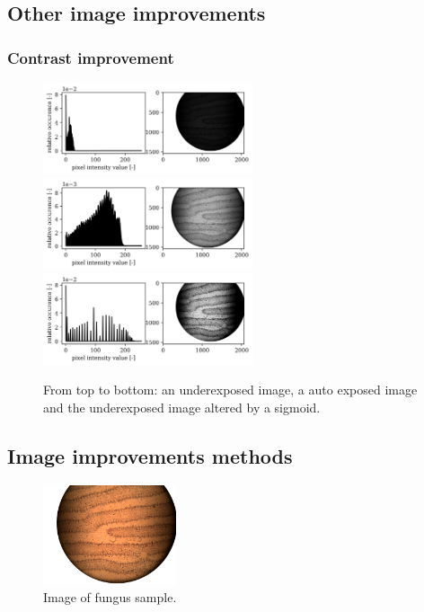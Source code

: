 \subsection{Other image improvements}
\subsubsection{Contrast improvement}
\begin{figure}
  \centering
  \includegraphics[width=0.55\textwidth,keepaspectratio]{afbeeldingen/Histogram_results/donkerhistogram.png}
  \includegraphics[width=0.55\textwidth,keepaspectratio]{afbeeldingen/Histogram_results/lichthistogram.png}
  \includegraphics[width=0.55\textwidth,keepaspectratio]{afbeeldingen/Histogram_results/improved_contrast_histogram.png}
  \caption{From top to bottom: an underexposed image, a auto exposed image and the underexposed image altered by a sigmoid.}
  \label{fig:contrast_improvement}
\end{figure}


\subsection{Image improvements methods}

\begin{figure}
    \includegraphics[width=0.35\textwidth, frame]{afbeeldingen/fungus.png}
  	\caption{Image of fungus sample.}
  	\label{fig_fungus}
\end{figure}


